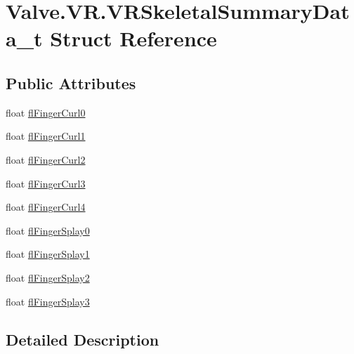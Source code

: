 \hypertarget{struct_valve_1_1_v_r_1_1_v_r_skeletal_summary_data__t}{}\section{Valve.\+V\+R.\+V\+R\+Skeletal\+Summary\+Data\+\_\+t Struct Reference}
\label{struct_valve_1_1_v_r_1_1_v_r_skeletal_summary_data__t}
\subsection*{Public Attributes}
\begin{DoxyCompactItemize}
\item 
float \mbox{\hyperlink{struct_valve_1_1_v_r_1_1_v_r_skeletal_summary_data__t_a642b8660dabd1e97c5a408815d26434e}{fl\+Finger\+Curl0}}
\item 
float \mbox{\hyperlink{struct_valve_1_1_v_r_1_1_v_r_skeletal_summary_data__t_a52ebae3a19e336b1642811c1334dd2ba}{fl\+Finger\+Curl1}}
\item 
float \mbox{\hyperlink{struct_valve_1_1_v_r_1_1_v_r_skeletal_summary_data__t_aaf2a53f94891336ceb562f347642ccd4}{fl\+Finger\+Curl2}}
\item 
float \mbox{\hyperlink{struct_valve_1_1_v_r_1_1_v_r_skeletal_summary_data__t_a9794be4ae9c57d060b3cf0ad8fabaeff}{fl\+Finger\+Curl3}}
\item 
float \mbox{\hyperlink{struct_valve_1_1_v_r_1_1_v_r_skeletal_summary_data__t_a176d092538adcaa4b4f67289a1eea74d}{fl\+Finger\+Curl4}}
\item 
float \mbox{\hyperlink{struct_valve_1_1_v_r_1_1_v_r_skeletal_summary_data__t_a54fcea4a60796893eed4b09758bdb0e2}{fl\+Finger\+Splay0}}
\item 
float \mbox{\hyperlink{struct_valve_1_1_v_r_1_1_v_r_skeletal_summary_data__t_a8aab84b9fc29b5f9ad1eab2b3e7c23db}{fl\+Finger\+Splay1}}
\item 
float \mbox{\hyperlink{struct_valve_1_1_v_r_1_1_v_r_skeletal_summary_data__t_a9698d32bca461c86ac250ae5509e0e6f}{fl\+Finger\+Splay2}}
\item 
float \mbox{\hyperlink{struct_valve_1_1_v_r_1_1_v_r_skeletal_summary_data__t_a9dca59ca65f7bc3457dfcb01b42052a5}{fl\+Finger\+Splay3}}
\end{DoxyCompactItemize}


\subsection{Detailed Description}


